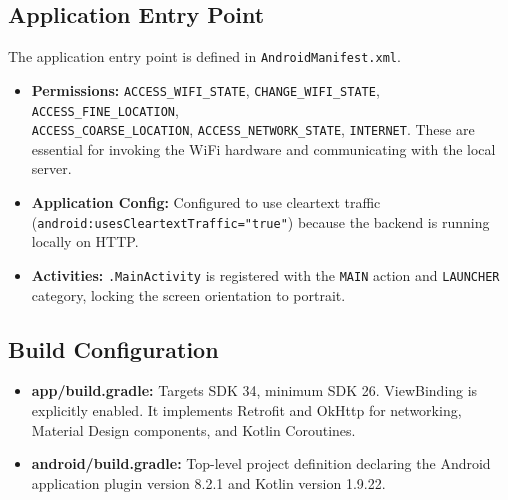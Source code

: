 \documentclass[11pt,a4paper]{article}
\begin{document}
\subsection{Application Entry Point}
The application entry point is defined in \texttt{AndroidManifest.xml}.
\begin{itemize}
\item \textbf{Permissions:} \texttt{ACCESS\_WIFI\_STATE}, \texttt{CHANGE\_WIFI\_STATE}, \texttt{ACCESS\_FINE\_LOCATION}, \\ \texttt{ACCESS\_COARSE\_LOCATION}, \texttt{ACCESS\_NETWORK\_STATE}, \texttt{INTERNET}. These are essential for invoking the WiFi hardware and communicating with the local server.
\item \textbf{Application Config:} Configured to use cleartext traffic (\texttt{android:usesCleartextTraffic="true"}) because the backend is running locally on HTTP.
\item \textbf{Activities:} \texttt{.MainActivity} is registered with the \texttt{MAIN} action and \texttt{LAUNCHER} category, locking the screen orientation to portrait.
\end{itemize}
\subsection{Build Configuration}
\begin{itemize}
\item \textbf{app/build.gradle:} Targets SDK 34, minimum SDK 26. ViewBinding is explicitly enabled. It implements Retrofit and OkHttp for networking, Material Design components, and Kotlin Coroutines.
\item \textbf{android/build.gradle:} Top-level project definition declaring the Android application plugin version 8.2.1 and Kotlin version 1.9.22.
\end{itemize}
\end{document}
